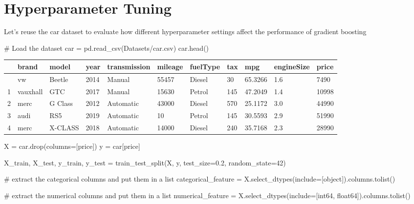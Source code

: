 \documentclass[
  letterpaper,
  DIV=11,
  numbers=noendperiod]{scrreprt}
\newenvironment{Shaded}{\begin{snugshade}}{\end{snugshade}}
\newcommand{\CommentTok}[1]{\textcolor[rgb]{0.37,0.37,0.37}{#1}}
\newcommand{\DecValTok}[1]{\textcolor[rgb]{0.68,0.00,0.00}{#1}}
\newcommand{\FloatTok}[1]{\textcolor[rgb]{0.68,0.00,0.00}{#1}}
\newcommand{\NormalTok}[1]{\textcolor[rgb]{0.00,0.23,0.31}{#1}}
\newcommand{\OperatorTok}[1]{\textcolor[rgb]{0.37,0.37,0.37}{#1}}
\newcommand{\StringTok}[1]{\textcolor[rgb]{0.13,0.47,0.30}{#1}}
\begin{document}
\section{Hyperparameter Tuning}\label{hyperparameter-tuning-1}

Let's reuse the car dataset to evaluate how different hyperparameter
settings affect the performance of gradient boosting

\begin{Shaded}
\begin{Highlighting}[]
\CommentTok{\# Load the dataset}
\NormalTok{car }\OperatorTok{=}\NormalTok{ pd.read\_csv(}\StringTok{\textquotesingle{}Datasets/car.csv\textquotesingle{}}\NormalTok{)}
\NormalTok{car.head()}
\end{Highlighting}
\end{Shaded}

\begin{longtable}[]{@{}lllllllllll@{}}
\toprule\noalign{}
& brand & model & year & transmission & mileage & fuelType & tax & mpg &
engineSize & price \\
\midrule\noalign{}
\endhead
\bottomrule\noalign{}
\endlastfoot
0 & vw & Beetle & 2014 & Manual & 55457 & Diesel & 30 & 65.3266 & 1.6 &
7490 \\
1 & vauxhall & GTC & 2017 & Manual & 15630 & Petrol & 145 & 47.2049 &
1.4 & 10998 \\
2 & merc & G Class & 2012 & Automatic & 43000 & Diesel & 570 & 25.1172 &
3.0 & 44990 \\
3 & audi & RS5 & 2019 & Automatic & 10 & Petrol & 145 & 30.5593 & 2.9 &
51990 \\
4 & merc & X-CLASS & 2018 & Automatic & 14000 & Diesel & 240 & 35.7168 &
2.3 & 28990 \\
\end{longtable}

\begin{Shaded}
\begin{Highlighting}[]
\NormalTok{X }\OperatorTok{=}\NormalTok{ car.drop(columns}\OperatorTok{=}\NormalTok{[}\StringTok{\textquotesingle{}price\textquotesingle{}}\NormalTok{])}
\NormalTok{y }\OperatorTok{=}\NormalTok{ car[}\StringTok{\textquotesingle{}price\textquotesingle{}}\NormalTok{]}

\NormalTok{X\_train, X\_test, y\_train, y\_test }\OperatorTok{=}\NormalTok{ train\_test\_split(X, y, test\_size}\OperatorTok{=}\FloatTok{0.2}\NormalTok{, random\_state}\OperatorTok{=}\DecValTok{42}\NormalTok{)}

\CommentTok{\# extract the categorical columns and put them in a list}
\NormalTok{categorical\_feature }\OperatorTok{=}\NormalTok{ X.select\_dtypes(include}\OperatorTok{=}\NormalTok{[}\StringTok{\textquotesingle{}object\textquotesingle{}}\NormalTok{]).columns.tolist()}

\CommentTok{\# extract the numerical columns and put them in a list}
\NormalTok{numerical\_feature }\OperatorTok{=}\NormalTok{ X.select\_dtypes(include}\OperatorTok{=}\NormalTok{[}\StringTok{\textquotesingle{}int64\textquotesingle{}}\NormalTok{, }\StringTok{\textquotesingle{}float64\textquotesingle{}}\NormalTok{]).columns.tolist()}
\end{Highlighting}
\end{Shaded}
\end{document}
